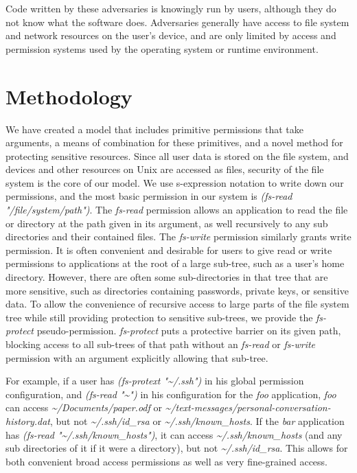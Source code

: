Code written by these adversaries is knowingly run by users, although they do not know what the software does.  Adversaries generally have access to file system and network resources on the user's device, and are only limited by access and permission systems used by the operating system or runtime environment.

\section{Methodology}\label{section:methodology}
We have created a model that includes primitive permissions that take arguments, a means of combination for these primitives, and a novel method for protecting sensitive resources.
Since all user data is stored on the file system, and devices and other resources on Unix are accessed as files, security of the file system is the core of our model.
We use s-expression notation to write down our permissions, and the most basic permission in our system is \textit{(fs-read "/file/system/path")}.  
The \textit{fs-read} permission allows an application to read the file or directory at the path given in its argument, as well recursively to any sub directories and their contained files.
The \textit{fs-write} permission similarly grants write permission.
It is often convenient and desirable for users to give read or write permissions to applications at the root of a large sub-tree, such as a user's home directory.  
However, there are often some sub-directories in that tree that are more sensitive, such as directories containing passwords, private keys, or sensitive data.
To allow the convenience of recursive access to large parts of the file system tree while still providing protection to sensitive sub-trees, we provide the \textit{fs-protect} pseudo-permission.
\textit{fs-protect} puts a protective barrier on its given path, blocking access to all sub-trees of that path without an \textit{fs-read} or \textit{fs-write} permission with an argument explicitly allowing that sub-tree.

For example, if a user has \textit{(fs-protext "\textasciitilde/.ssh")} in his global permission configuration, and \textit{(fs-read "\textasciitilde")} in his configuration for the \textit{foo} application, \textit{foo} can access \textit{\textasciitilde/Documents/paper.odf} or \textit{\textasciitilde/text-messages/personal-conversation-history.dat}, but not \textit{\textasciitilde/.ssh/id\_rsa} or \textit{\textasciitilde/.ssh/known\_hosts}.  
If the \textit{bar} application has \textit{(fs-read "\textasciitilde/.ssh/known\_hosts")}, it can access \textit{\textasciitilde/.ssh/known\_hosts} (and any sub directories of it if it were a directory), but not \textit{\textasciitilde/.ssh/id\_rsa}.
This allows for both convenient broad access permissions as well as very fine-grained access.


